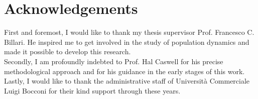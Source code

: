 





\chapter*{Acknowledgements}%
\thispagestyle{empty}

First and foremost, I would like to thank my thesis supervisor Prof. Francesco C. Billari.
He inspired me to get involved in the study of population dynamics and made it possible to develop this research. \\
Secondly, I am profoundly indebted to Prof. Hal Caswell for his precise methodological approach and for his guidance in the early stages of this work.\\
Lastly, I would like to thank the administrative staff of Università Commerciale Luigi Bocconi for their kind support through these years.



